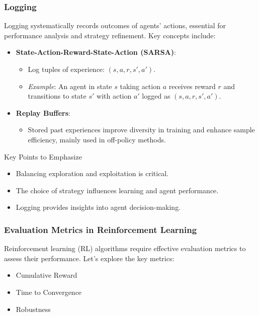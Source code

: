 \documentclass[aspectratio=169]{beamer}
\begin{document}
\begin{frame}[fragile]
    \frametitle{Logging}
    Logging systematically records outcomes of agents' actions, essential for performance analysis and strategy refinement. Key concepts include:
    \begin{itemize}
        \item \textbf{State-Action-Reward-State-Action (SARSA)}:
        \begin{itemize}
            \item Log tuples of experience: \((s, a, r, s', a')\).
            \item \textit{Example}: An agent in state \(s\) taking action \(a\) receives reward \(r\) and transitions to state \(s'\) with action \(a'\) logged as \((s, a, r, s', a')\).
        \end{itemize}

        \item \textbf{Replay Buffers}:
        \begin{itemize}
            \item Stored past experiences improve diversity in training and enhance sample efficiency, mainly used in off-policy methods.
        \end{itemize}
    \end{itemize}
    
    \begin{block}{Key Points to Emphasize}
        \begin{itemize}
            \item Balancing exploration and exploitation is critical.
            \item The choice of strategy influences learning and agent performance.
            \item Logging provides insights into agent decision-making.
        \end{itemize}
    \end{block}
\end{frame}

\begin{frame}[fragile]
    \frametitle{Evaluation Metrics in Reinforcement Learning}
    Reinforcement learning (RL) algorithms require effective evaluation metrics to assess their performance. Let's explore the key metrics:
    \begin{itemize}
        \item Cumulative Reward
        \item Time to Convergence
        \item Robustness
    \end{itemize}
\end{frame}
\end{document}
